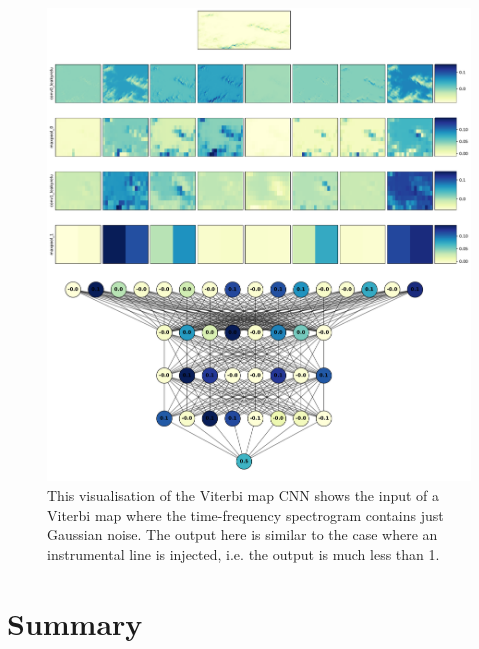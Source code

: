 \begin{figure}[h]
	\centering
	\includegraphics[width=\textwidth]{C4_cnn/vitmap_cnn_visualisation_noise.pdf}
	\caption[Network visualisation for noise.]{This visualisation of the Viterbi map \gls{CNN} shows the input of a Viterbi map where the time-frequency spectrogram contains just Gaussian noise. The output here is similar to the case where an instrumental line is injected, i.e. the output is much less than 1. }
	\label{machine:cnn:vis:vitmap:noise}
\end{figure}

\clearpage

\section{Summary}


